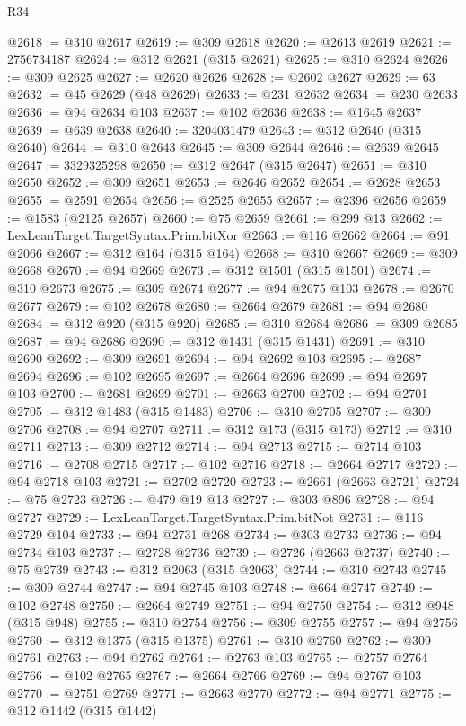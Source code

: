 \begin{lexlean}{R34}
\begin{coremodule}
@2618 := @310 @2617
@2619 := @309 @2618
@2620 := @2613 @2619
@2621 := 2756734187
@2624 := @312 @2621 (@315 @2621)
@2625 := @310 @2624
@2626 := @309 @2625
@2627 := @2620 @2626
@2628 := @2602 @2627
@2629 := 63
@2632 := @45 @2629 (@48 @2629)
@2633 := @231 @2632
@2634 := @230 @2633
@2636 := @94 @2634 @103
@2637 := @102 @2636
@2638 := @1645 @2637
@2639 := @639 @2638
@2640 := 3204031479
@2643 := @312 @2640 (@315 @2640)
@2644 := @310 @2643
@2645 := @309 @2644
@2646 := @2639 @2645
@2647 := 3329325298
@2650 := @312 @2647 (@315 @2647)
@2651 := @310 @2650
@2652 := @309 @2651
@2653 := @2646 @2652
@2654 := @2628 @2653
@2655 := @2591 @2654
@2656 := @2525 @2655
@2657 := @2396 @2656
@2659 := @1583 (@2125 @2657)
@2660 := @75 @2659
@2661 := @299 @13
@2662 := LexLeanTarget.TargetSyntax.Prim.bitXor
@2663 := @116 @2662
@2664 := @91 @2066
@2667 := @312 @164 (@315 @164)
@2668 := @310 @2667
@2669 := @309 @2668
@2670 := @94 @2669
@2673 := @312 @1501 (@315 @1501)
@2674 := @310 @2673
@2675 := @309 @2674
@2677 := @94 @2675 @103
@2678 := @2670 @2677
@2679 := @102 @2678
@2680 := @2664 @2679
@2681 := @94 @2680
@2684 := @312 @920 (@315 @920)
@2685 := @310 @2684
@2686 := @309 @2685
@2687 := @94 @2686
@2690 := @312 @1431 (@315 @1431)
@2691 := @310 @2690
@2692 := @309 @2691
@2694 := @94 @2692 @103
@2695 := @2687 @2694
@2696 := @102 @2695
@2697 := @2664 @2696
@2699 := @94 @2697 @103
@2700 := @2681 @2699
@2701 := @2663 @2700
@2702 := @94 @2701
@2705 := @312 @1483 (@315 @1483)
@2706 := @310 @2705
@2707 := @309 @2706
@2708 := @94 @2707
@2711 := @312 @173 (@315 @173)
@2712 := @310 @2711
@2713 := @309 @2712
@2714 := @94 @2713
@2715 := @2714 @103
@2716 := @2708 @2715
@2717 := @102 @2716
@2718 := @2664 @2717
@2720 := @94 @2718 @103
@2721 := @2702 @2720
@2723 := @2661 (@2663 @2721)
@2724 := @75 @2723
@2726 := @479 @19 @13
@2727 := @303 @896
@2728 := @94 @2727
@2729 := LexLeanTarget.TargetSyntax.Prim.bitNot
@2731 := @116 @2729 @104
@2733 := @94 @2731 @268
@2734 := @303 @2733
@2736 := @94 @2734 @103
@2737 := @2728 @2736
@2739 := @2726 (@2663 @2737)
@2740 := @75 @2739
@2743 := @312 @2063 (@315 @2063)
@2744 := @310 @2743
@2745 := @309 @2744
@2747 := @94 @2745 @103
@2748 := @664 @2747
@2749 := @102 @2748
@2750 := @2664 @2749
@2751 := @94 @2750
@2754 := @312 @948 (@315 @948)
@2755 := @310 @2754
@2756 := @309 @2755
@2757 := @94 @2756
@2760 := @312 @1375 (@315 @1375)
@2761 := @310 @2760
@2762 := @309 @2761
@2763 := @94 @2762
@2764 := @2763 @103
@2765 := @2757 @2764
@2766 := @102 @2765
@2767 := @2664 @2766
@2769 := @94 @2767 @103
@2770 := @2751 @2769
@2771 := @2663 @2770
@2772 := @94 @2771
@2775 := @312 @1442 (@315 @1442)

\end{coremodule}
\end{lexlean}
